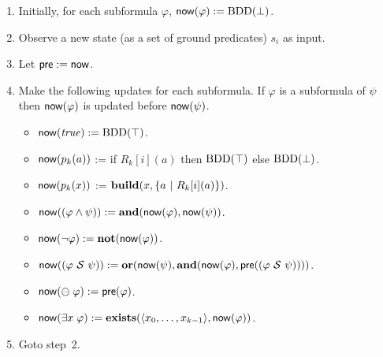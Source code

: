 \begin{enumerate}
\item Initially, for each subformula $\varphi$,
$\mathsf{now} ( \varphi ) := \mathrm{BDD}(\bot)$.
\item Observe a new state (as a set of ground predicates) $s_i$ as input. 
\item Let $\mathsf{pre} := \mathsf{now}$.
\item Make the following updates for each subformula. If $\varphi$ is
      a subformula of $\psi$ then $\mathsf{now} ( \varphi )$ is updated before 
      $\mathsf{now} ( \psi )$.
\begin{itemize}
  \item $\mathsf{now} ( \mathit{true} ) := \mathrm{BDD}(\top)$.
  \item $\mathsf{now} ( p_k ( a ) )$ := if $R_k [ i ] ( a )$ then
  $\mathrm{BDD}(\top)$ else $\mathrm{BDD}(\bot)$.
  \item $\mathsf{now} ( p_k ( x ) )$ :=
     $\mathbf{build} ( x ,  \{ a \ | \ R_k[i] ( a  ) \} )$.
  \item $\mathsf{now} ( ( \varphi \wedge \psi ) ) := 
  \mathbf{and} ( \mathsf{now} ( \varphi ) , \mathsf{now} ( \psi ))$.
  \item $\mathsf{now} ( \neg \varphi  ) := \mathbf{not} ( \mathsf{now} ( \varphi ))$.
  \item $\mathsf{now} ( ( \varphi\ {\cal S}\ \psi ) ) :=  
  \mathbf{or} ( \mathsf{now} ( \psi  ) , \mathbf{and} ( \mathsf{now} ( \varphi ) ,
      \mathsf{pre} ( ( \varphi \ {\cal S} \ \psi ))))$.
  \item $\mathsf{now} ( \ominus \; \varphi ) := \mathsf{pre} ( \varphi )$.
  \item $\mathsf{now} ( \exists x \; \varphi ) := 
  \mathbf{exists} (\langle x_0,\ldots,x_{k-1} \rangle, \mathsf{now} ( \varphi ))$.
\end{itemize}
\item Goto step~2.
\end{enumerate}

